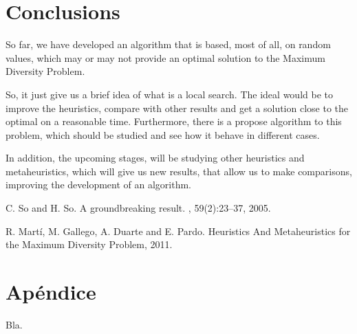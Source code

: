 \documentclass{ci5652}
\begin{document}
\section{Conclusions}

So far, we have developed an algorithm that is based, most of all, on
random values, which may or may not provide an optimal solution to the
Maximum Diversity Problem.

So, it just give us a brief idea of what is a
local search. The ideal would be to improve the heuristics, compare with
other results and get a solution close to the optimal on a reasonable time.
Furthermore, there is a propose algorithm to this problem, which should be
studied and see how it behave in different cases.

In addition, the upcoming
stages, will be studying other heuristics and metaheuristics, which will
give us new results, that allow us to make comparisons, improving the
development of an algorithm.


\small


\begin{thebibliography}{99}

C. So and H. So.
\newblock A groundbreaking result.
, 59(2):23--37, 2005.

R. Martí, M. Gallego, A. Duarte and E. Pardo.
\newblock Heuristics And Metaheuristics for the Maximum Diversity Problem, 2011.


\end{thebibliography}


\newpage
\section*{Apéndice}

Bla.
\end{document}
